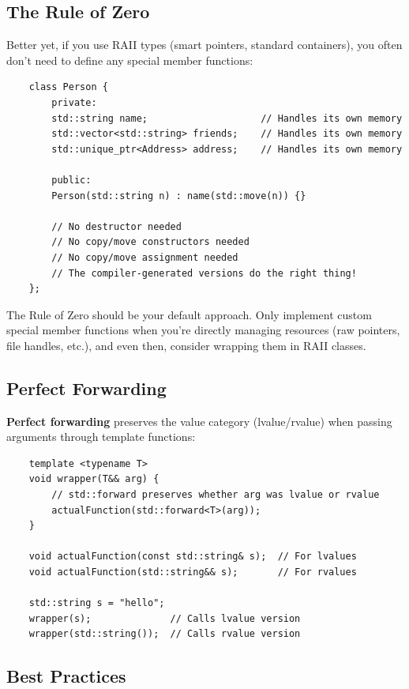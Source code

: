 \subsection{The Rule of Zero}

Better yet, if you use RAII types (smart pointers, standard containers), you often don't need to define any special member functions:

\begin{lstlisting}
	class Person {
		private:
		std::string name;                    // Handles its own memory
		std::vector<std::string> friends;    // Handles its own memory
		std::unique_ptr<Address> address;    // Handles its own memory
		
		public:
		Person(std::string n) : name(std::move(n)) {}
		
		// No destructor needed
		// No copy/move constructors needed
		// No copy/move assignment needed
		// The compiler-generated versions do the right thing!
	};
\end{lstlisting}

\begin{remark}
	The Rule of Zero should be your default approach. Only implement custom special member functions when you're directly managing resources (raw pointers, file handles, etc.), and even then, consider wrapping them in RAII classes.
\end{remark}

\subsection{Perfect Forwarding}

\textbf{Perfect forwarding} preserves the value category (lvalue/rvalue) when passing arguments through template functions:

\begin{lstlisting}
	template <typename T>
	void wrapper(T&& arg) {
		// std::forward preserves whether arg was lvalue or rvalue
		actualFunction(std::forward<T>(arg));
	}
	
	void actualFunction(const std::string& s);  // For lvalues
	void actualFunction(std::string&& s);       // For rvalues
	
	std::string s = "hello";
	wrapper(s);              // Calls lvalue version
	wrapper(std::string());  // Calls rvalue version
\end{lstlisting}

\subsection{Best Practices}

